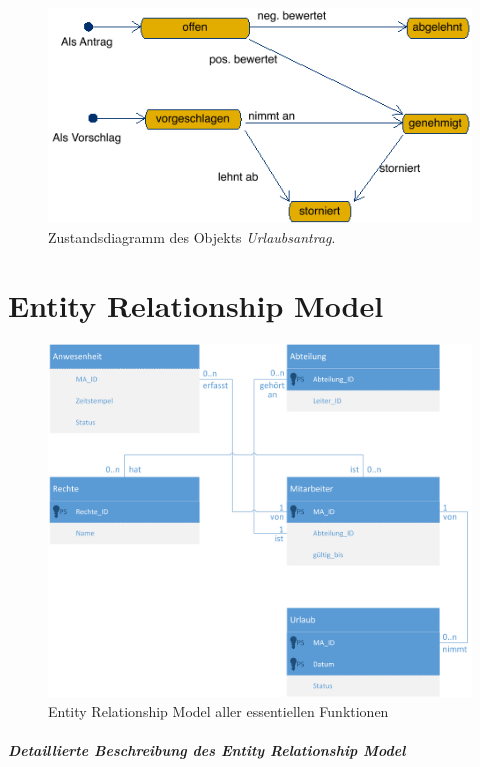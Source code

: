 \vspace{1cm}
\begin{figure}[hbp]
	\centering
	\includegraphics[width=0.9\linewidth]{UML/Export/Urlaubsantrag.png}
	\caption{Zustandsdiagramm des Objekts \textit{Urlaubsantrag}.}
	\label{Uantrag}
\end{figure}

\newpage

\chapter{Entity Relationship Model}

\begin{figure}[hbp]
	\centering
	\includegraphics[width=1\linewidth]{UML/Export/erm.png}
	\caption{Entity Relationship Model aller essentiellen Funktionen}
	\label{ERM}
\end{figure}

\newpage
\paragraph*{Detaillierte Beschreibung des Entity Relationship Model}\mbox{} \\

